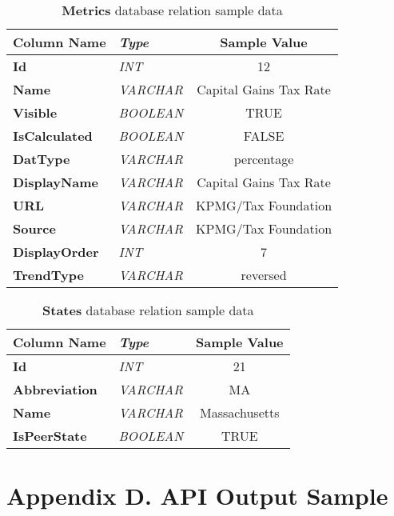 \begin{appendices}
		\begin{table}[h]
			\centering
			\begin{tabularx}{\textwidth}{@{} >{\bf}Y >{\em}l c @{}} %
				\toprule
				Column Name		& Type		& Sample Value				\\
				\midrule
				
				Id				& INT		& 12						\\
				Name			& VARCHAR	& Capital Gains Tax Rate	\\
				Visible			& BOOLEAN	& TRUE						\\
				IsCalculated	& BOOLEAN	& FALSE						\\
				DatType			& VARCHAR	& percentage				\\
				DisplayName		& VARCHAR	& Capital Gains Tax Rate	\\
				URL				& VARCHAR	& KPMG/Tax Foundation		\\
				Source			& VARCHAR	& KPMG/Tax Foundation		\\
				DisplayOrder	& INT		& 7							\\
				TrendType		& VARCHAR	& reversed					\\
				
				\bottomrule
			\end{tabularx}
			\caption{\textbf{Metrics} database relation sample data}
			\label{tbl:metrictable}
		\end{table}
		
		\begin{table}[h]
			\centering
			\begin{tabularx}{\textwidth}{@{} >{\bf}Y >{\em}l c @{}} %
				\toprule
				Column Name		& Type		& Sample Value	\\
				\midrule
				
				Id				& INT		& 21			\\
				Abbreviation	& VARCHAR	& MA			\\
				Name			& VARCHAR	& Massachusetts	\\
				IsPeerState		& BOOLEAN	& TRUE			\\
				
				\bottomrule
			\end{tabularx}
			\caption{\textbf{States} database relation sample data}
			\label{tbl:statestable}
		\end{table}
		
	\chapter{Appendix D. API Output Sample} \label{app:dbsample}
	

\end{appendices}
